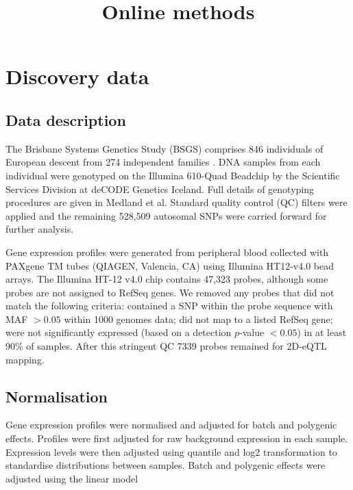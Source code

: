 \documentclass{article}
\title{Online methods}
\date{}
\author{}
\begin{document}
\maketitle


\tableofcontents

\section{Discovery data}

\subsection{Data description}

The Brisbane Systems Genetics Study (BSGS) comprises 846 individuals of European descent from 274 independent families \cite{Powell2012}. DNA samples from each individual were genotyped on the Illumina 610-Quad Beadchip by the Scientific Services Division at deCODE Genetics Iceland. Full details of genotyping procedures are given in Medland et al. \cite{Medland2009} Standard quality control (QC) filters were applied and the remaining 528,509 autosomal SNPs were carried forward for further analysis. 

Gene expression profiles were generated from peripheral blood collected with PAXgene TM tubes (QIAGEN, Valencia, CA) using Illumina HT12-v4.0 bead arrays. The Illumina HT-12 v4.0 chip contains 47,323 probes, although some probes are not assigned to RefSeq genes. We removed any probes that did not match the following criteria: contained a SNP within the probe sequence with MAF $ > 0.05$ within 1000 genomes data; did not map to a listed RefSeq gene; were not significantly expressed (based on a detection $p$-value $< 0.05$) in at least 90\% of samples. After this stringent QC 7339 probes remained for 2D-eQTL mapping.


\subsection{Normalisation}

Gene expression profiles were normalised and adjusted for batch and polygenic effects. Profiles were first adjusted for raw background expression in each sample. Expression levels were then adjusted using quantile and log2 transformation to standardise distributions between samples. Batch and polygenic effects were adjusted using the linear model
\end{document}
